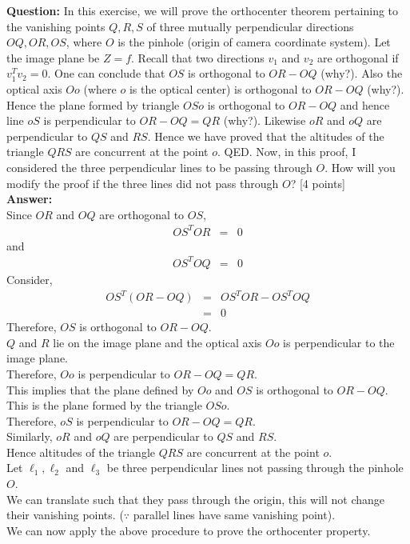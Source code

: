 \documentclass[11pt]{article}
\begin{document}
\maketitle

\textbf{Question:} In this exercise, we will prove the orthocenter theorem pertaining to the vanishing points $Q,R,S$ of three mutually perpendicular directions $OQ, OR, OS$, where $O$ is the pinhole (origin of camera coordinate system). Let the image plane be $Z = f$. Recall that two directions $v_1$ and $v_2$ are orthogonal if $v^T_1 v_2 = 0$. One can conclude that $OS$ is orthogonal to $OR-OQ$ (why?). Also the optical axis $Oo$ (where $o$ is the optical center) is orthogonal to $OR-OQ$ (why?). Hence the plane formed by triangle $OSo$ is orthogonal to $OR-OQ$ and hence line $oS$ is perpendicular to $OR-OQ = QR$ (why?). Likewise $oR$ and $oQ$ are perpendicular to $QS$ and $RS$. Hence we have proved that the altitudes of the triangle $QRS$ are concurrent at the point $o$. QED. Now, in this proof, I considered the three perpendicular lines to be passing through $O$. How will you modify the proof if the three lines did not pass through $O$? \textsf{[4 points]} \\

\textbf{Answer:} \\
Since $OR$ and $OQ$ are orthogonal to $OS$,
\begin{eqnarray*}
OS^TOR &=& 0
\end{eqnarray*}
and
\begin{eqnarray*}
OS^TOQ &=& 0
\end{eqnarray*}
Consider,
\begin{eqnarray*}
OS^T(OR - OQ) &=& OS^TOR - OS^TOQ\\
&=& 0
\end{eqnarray*}
Therefore, $OS$ is orthogonal to $OR-OQ$.\\

$Q$ and $R$ lie on the image plane and the optical axis $Oo$ is perpendicular to the image plane.\\
Therefore, $Oo$ is perpendicular to $OR-OQ = QR$.\\

This implies that the plane defined by $Oo$ and $OS$ is orthogonal to $OR - OQ$. This is the plane formed by the triangle $OSo$.\\
Therefore, $oS$ is perpendicular to $OR - OQ = QR$.\\

Similarly, $oR$ and $oQ$ are perpendicular to $QS$ and $RS$. \\
Hence altitudes of the triangle $QRS$ are concurrent at the point $o$.\\

Let $\ell_1, \ell_2$ and $\ell_3$ be three perpendicular lines not passing through the pinhole $O$. \\
We can translate such that they pass through the origin, this will not change their vanishing points. ($\because$ parallel lines have same vanishing point). \\
We can now apply the above procedure to prove the orthocenter property. \\
\end{document}
